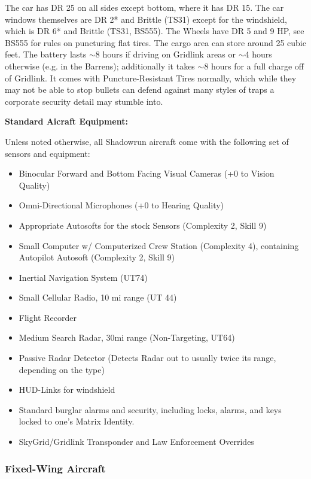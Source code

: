 The car has DR 25 on all sides except bottom, where it has DR 15. The car windows themselves are DR 2* and Brittle (TS31) except for the windshield, which is DR 6* and Brittle (TS31, BS555). The Wheels have DR 5 and 9 HP, see BS555 for rules on puncturing flat tires. The cargo area can store around 25 cubic feet. The battery lasts $\sim$8 hours if driving on Gridlink areas or $\sim$4 hours otherwise (e.g. in the Barrens); additionally it takes $\sim$8 hours for a full charge off of Gridlink. It comes with Puncture-Resistant Tires normally, which while they may not be able to stop bullets can defend against many styles of traps a corporate security detail may stumble into.


\textbf{Standard Aicraft Equipment:}

Unless noted otherwise, all Shadowrun aircraft come with the following set of sensors and equipment:
\begin{itemize}
	\itemsep 0pt
	\item Binocular Forward and Bottom Facing Visual Cameras (+0 to Vision Quality)
	\item Omni-Directional Microphones (+0 to Hearing Quality)
	\item Appropriate Autosofts for the stock Sensors (Complexity 2, Skill 9)
	\item Small Computer w/ Computerized Crew Station (Complexity 4), containing Autopilot Autosoft (Complexity 2, Skill 9)
	\item Inertial Navigation System (UT74) 
	\item Small Cellular Radio, 10 mi range (UT 44)
	\item Flight Recorder
	\item Medium Search Radar, 30mi range (Non-Targeting, UT64)
	\item Passive Radar Detector (Detects Radar out to usually twice its range, depending on the type)
	\item HUD-Links for windshield
	\item Standard burglar alarms and security, including locks, alarms, and keys locked to one's Matrix Identity.
	\item SkyGrid/Gridlink Transponder and Law Enforcement Overrides
\end{itemize}

\subsubsection{Fixed-Wing Aircraft}

